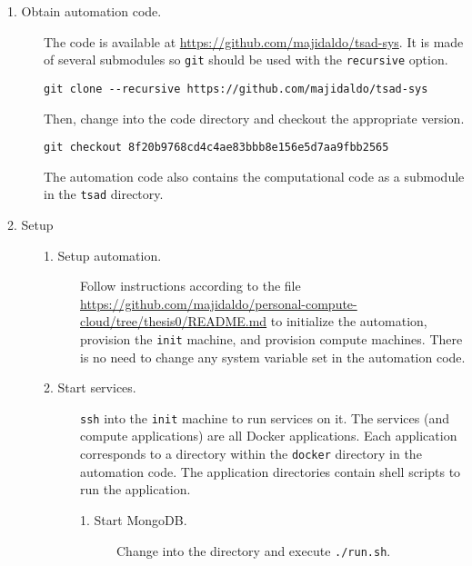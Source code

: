\begin{description}



\item[1. Obtain automation code.] \hfill

  The code is available at \url{https://github.com/majidaldo/tsad-sys}.
  It is made of several submodules so \texttt{git} should be used with the \texttt{recursive} option.%
  
\begin{verbatim}
git clone --recursive https://github.com/majidaldo/tsad-sys
\end{verbatim}
  Then, change into the code directory and checkout the appropriate version.
  

\begin{verbatim}
git checkout 8f20b9768cd4c4ae83bbb8e156e5d7aa9fbb2565
\end{verbatim}

  The automation code also contains the computational code as a submodule in the \texttt{tsad} directory.


\item[2. Setup] \hfill

\begin{description}

\item[1. Setup automation.] \hfill

  Follow instructions according to the  file \url{https://github.com/majidaldo/personal-compute-cloud/tree/thesis0/README.md} to initialize the automation, provision the \texttt{init} machine, and provision compute machines.
  There is no need to change any system variable set in the automation code.


\item[2. Start services.] \hfill

  \texttt{ssh} into the \texttt{init} machine to run services on it.
  The services (and compute applications) are all \textsf{Docker} applications.
  Each application corresponds to a directory within the \texttt{docker} directory in the automation code.
  The application directories contain shell scripts to run the application.

  \begin{description}

  \item[1. Start \textsf{MongoDB}.] \hfill

    Change into the  directory and execute \texttt{./run.sh}.


\end{description}
\end{description}
\end{description}
